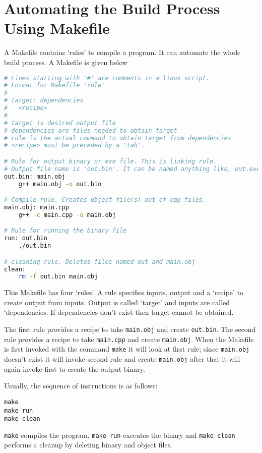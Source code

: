 \documentclass[12pt,a4paper]{article}
\begin{document}
\section{Automating the Build Process Using Makefile}
A Makefile contains `rules' to compile a program. It can automate the whole build process. A Makefile is given below
\begin{lstlisting}[language=bash,caption={Simple Makefile}]
# Lines starting with '#' are comments in a linux script.
# Format for Makefile 'rule'
#
# target: dependencies
# 	<recipe>
#
# target is desired output file
# dependencies are files needed to obtain target
# rule is the actual command to obtain target from dependencies
# <recipe> must be preceded by a 'tab'.

# Rule for output binary or exe file. This is linking rule.
# Output file name is 'out.bin'. It can be named anything like, out.exe or out.bin etc.
out.bin: main.obj
	g++ main.obj -o out.bin

# Compile rule. Creates object file(s) out of cpp files.
main.obj: main.cpp
	g++ -c main.cpp -o main.obj

# Rule for running the binary file
run: out.bin
	./out.bin

# cleaning rule. Deletes files named out and main.obj
clean:
	rm -f out.bin main.obj
\end{lstlisting}
This Makefile has four `rules'. A rule specifies inputs, output and a `recipe' to create output from inputs. Output is called `target' and inputs are called `dependencies. If dependencies don't exist then target cannot be obtained.

The first rule provides a recipe to take \verb|main.obj| and create \verb|out.bin|. The second rule  provides a recipe to take \verb|main.cpp| and create \verb|main.obj|. When the Makefile is first invoked with the command \verb|make| it will look at first rule; since \verb|main.obj| doesn't exist it will invoke second rule and create \verb|main.obj| after that it will again invoke first to create the output binary.

Usually, the sequence of instructions is as follows:
\begin{lstlisting}
make
make run
make clean
\end{lstlisting}
\verb|make| compiles the program, \verb|make run| executes the binary and \verb|make clean| performs a cleanup by deleting binary and object files.
\end{document}
